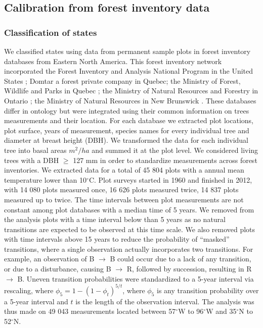 \subsection*{Calibration from forest inventory data}

\subsubsection*{Classification of states}

We classified states using data from permanent sample plots in forest inventory databases from
Eastern North America. This forest inventory network incorporated the Forest Inventory and Analysis
National Program in the United States \citep{Inventory2007}; Domtar a forest private company in
Quebec; the Ministry of Forest, Wildlife and Parks in Quebec \citep{MRN2013}; the Ministry of
Natural Resources and Forestry in Ontario \citep{OMNR2014}; the Ministry of Natural Resources in New
Brunswick \citep{Porter2001}. These databases differ in ontology but were integrated using their
common information on trees measurements and their location. For each database we extracted plot
locations, plot surface, years of measurement, species names for every individual tree and diameter
at breast height (DBH). We transformed the data for each individual tree into basal areas $m^2/ha$
and summed it at the plot level. We considered living trees with a DBH $\ge$ 127 mm in order to
standardize measurements across forest inventories. We extracted data for a total of 45 804 plots
with a annual mean temperature lower than 10$^{\circ}$C. Plot surveys started in 1960 and finished
in 2012, with 14 080 plots measured once, 16 626 plots measured twice, 14 837 plots measured up to
twice. The time intervals between plot measurements are not constant among plot databases with a
median time of 5 years. We removed from the analysis plots with a time interval below than 5 years
as no natural transitions are expected to be observed at this time scale. We also removed plots with
time intervals above 15 years to reduce the probability of ``masked'' transitions, where a single
observation actually incorporates two transitions. For example, an observation of B $\rightarrow$ B
could occur due to a lack of any transition, or due to a disturbance, causing B $\rightarrow$ R,
followed by succession, resulting in R $\rightarrow$ B.  Uneven transition probabilities were
standardized to a 5-year interval via rescaling, where $\phi_5 = 1 - (1 - \phi_{t})^{5/t}$, where
$\phi_5$ is any transition probability over a 5-year interval and $t$ is the length of the
observation interval. The analysis was thus made on 49 043 measurements located between
57$^{\circ}$W to 96$^{\circ}$W and 35$^{\circ}$N to 52$^{\circ}$N.

